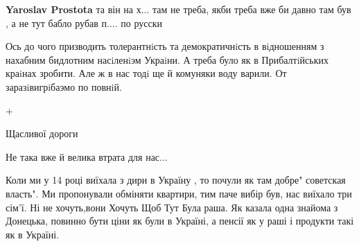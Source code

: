 \begin{itemize}
\begin{itemize}
 
\textbf{Yaroslav Prostota} та він на х... там не треба, якби треба вже би давно там був , а не тут бабло рубав п.... по русски

\end{itemize}

 
Ось до чого призводить толерантнiсть та демократичнiсть в вiдношенням з нахабним бидлотним насiленiэм Украiни. А треба було як в Прибалтiйських краiнах зробити. Але ж в нас тодi ще й комуняки воду варили. От заразiвигрiбаэмо по повнiй.

 
+

 
Щасливої дороги

 
Не така вже й велика втрата для нас...

 

Коли ми у 14 році виїхала з дири в Україну , то почули як там добре" советская
власть". Ми пропонували обміняти квартири, тим паче вибір був, нас виїхало три
сім'ї. Ні не хочуть,вони Хочуть Щоб Тут Була раша. Як казала одна знайома з
Донецька, повинно бути ціни як були в Україні, а пенсії як у раші і продукти
такі як в Україні.



\end{itemize}
